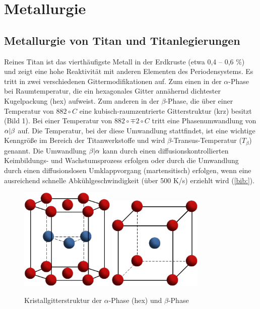 \chapter{Metallurgie}	


\section{Metallurgie von Titan und Titanlegierungen}
Reines Titan ist das vierthäufigste Metall in der Erdkruste (etwa 0,4 -- 0,6 \%) und zeigt eine hohe Reaktivität mit anderen Elementen des Periodensystems. Es tritt in zwei verschiedenen Gittermodifikationen auf. Zum einen in der $\alpha$-Phase bei Raumtemperatur, die ein hexagonales Gitter annähernd dichtester Kugelpackung (hex) aufweist. Zum anderen in der $\beta$-Phase, die über einer Temperatur von $882 \circ C$ eine kubisch-raumzentrierte Gitterstruktur (krz) besitzt (Bild 1). Bei einer Temperatur von $882\circ \mp 2 \circ C$ tritt eine Phasenumwandlung von $\alpha \arrowvert \beta$ auf. Die Temperatur, bei der diese Umwandlung stattfindet, ist eine wichtige Kenngröße im Bereich der Titanwerkstoffe und wird $\beta$-Transus-Temperatur ($T_{\beta}$) genannt.
Die Umwandlung $\beta \arrowvert \alpha$ kann durch einen diffusionskontrollierten Keimbildungs- und Wachstumsprozess erfolgen oder durch die Umwandlung durch einen diffusionslosen Umklappvorgang (martensitisch) erfolgen, wenn eine ausreichend schnelle Abkühlgeschwindigkeit (über 500 K/s) erziehlt wird (\ref{bib:}).

\begin{figure}
	\centering
	\subfloat{}
	\includegraphics[width=0.4\textwidth]{Bilder/hcp}
	\hspace{2ex}
	\subfloat{}
	\includegraphics[width=0.4\textwidth]{Bilder/krz}
	\caption{Kristallgitterstruktur der $\alpha$-Phase (hex) und $\beta$-Phase}
	\label{fig:Kristallgitter}
\end{figure}


